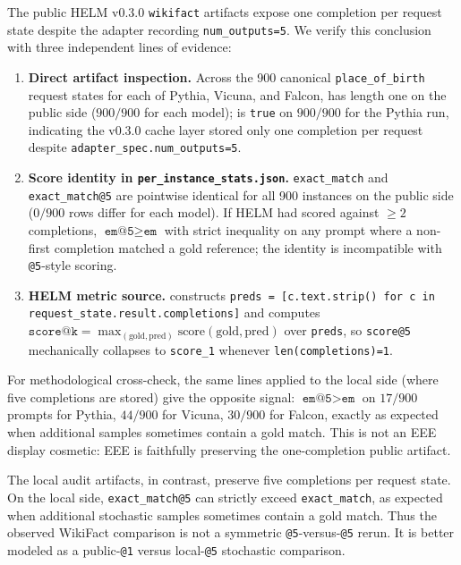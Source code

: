 \documentclass[11pt]{article}
\begin{document}
The public HELM v0.3.0 \texttt{wikifact} artifacts expose one
  completion per request state despite the adapter recording
  \texttt{num\_outputs=5}.
We verify this conclusion with three independent lines of evidence:
\begin{enumerate}
  \item \textbf{Direct artifact inspection.}
        Across the 900 canonical \texttt{place\_of\_birth} request
        states for each of Pythia, Vicuna, and Falcon,
         has length one on
        the public side ($900/900$ for each model);
         is \texttt{true} on
        $900/900$ for the Pythia run, indicating the v0.3.0 cache
        layer stored only one completion per request despite
        \texttt{adapter\_spec.num\_outputs=5}.
  \item \textbf{Score identity in \texttt{per\_instance\_stats.json}.}
        \texttt{exact\_match} and \texttt{exact\_match@5} are
        pointwise identical for all 900 instances on the public
        side ($0/900$ rows differ for each model).  If HELM had
        scored against $\geq 2$ completions, $\texttt{em@5} \geq
        \texttt{em}$ with strict inequality on any prompt where a
        non-first completion matched a gold reference; the
        identity is incompatible with \texttt{@5}-style scoring.
  \item \textbf{HELM metric source.}
        constructs \texttt{preds = [c.text.strip() for c in
        request\_state.result.completions]} and computes
        $\texttt{score@k} = \max_{(\text{gold}, \text{pred})}
        \text{score}(\text{gold}, \text{pred})$ over \texttt{preds},
        so \texttt{score@5} mechanically collapses to
        \texttt{score\_1} whenever \texttt{len(completions)=1}.
\end{enumerate}
For methodological cross-check, the same lines applied to the local
  side (where five completions are stored) give the opposite signal:
  $\texttt{em@5} > \texttt{em}$ on $17/900$ prompts for Pythia,
  $44/900$ for Vicuna, $30/900$ for Falcon, exactly as expected when
  additional samples sometimes contain a gold match.
This is not an EEE display cosmetic: EEE is faithfully preserving the
  one-completion public artifact.

The local audit artifacts, in contrast, preserve five completions per
  request state.  On the local side, \texttt{exact\_match@5} can
  strictly exceed \texttt{exact\_match}, as expected when additional
  stochastic samples sometimes contain a gold match.
Thus the observed WikiFact comparison is not a symmetric
  \texttt{@5}-versus-\texttt{@5} rerun.  It is better modeled as a
  public-\texttt{@1} versus local-\texttt{@5} stochastic comparison.
\end{document}
